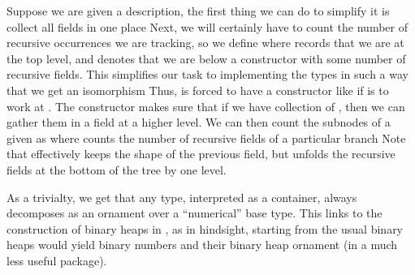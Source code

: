Suppose we are given a description, the first thing we can do to simplify it is collect all fields in one place
Next, we will certainly have to count the number of recursive occurrences we are tracking, so we define
where  records that we are at the top level, and  denotes that we are below a constructor with some number of recursive fields. This simplifies our task to implementing the types in
such a way that we get an isomorphism 
Thus,  is forced to have a  constructor like 
if  is to work at . The  constructor makes sure that if we have collection of , then we can gather them in a field at a higher level. We can then count the subnodes of a given  as
where  counts the number of recursive fields of a particular branch
Note that  effectively keeps the shape of the previous field, but unfolds the recursive fields at the bottom of the tree by one level.


As a trivialty, we get that any type, interpreted as a container, always decomposes as an ornament over a ``numerical'' base type. This links to the construction of binary heaps in \cite{progorn}, as in hindsight, starting from the usual binary heaps would yield binary numbers and their binary heap ornament (in a much less useful package).